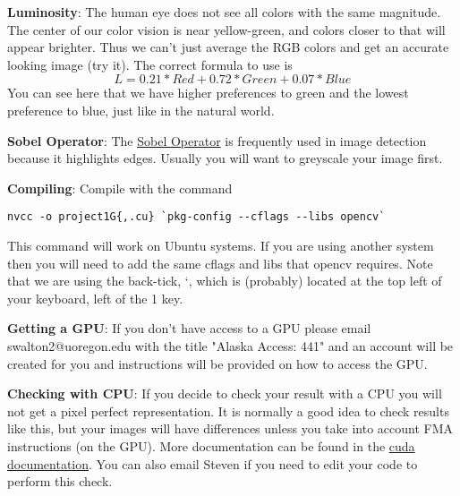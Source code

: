 \documentclass[12pt,letter]{article}
\begin{document}
\textbf{Luminosity}: The human eye does not see all colors with the same 
magnitude. The center of our color vision is near yellow-green, and colors
closer to that will appear brighter. Thus we can't just average the RGB colors
and get an accurate looking image (try it). The correct formula to use is
\begin{equation}
    L = 0.21 * Red + 0.72 * Green + 0.07 * Blue
\end{equation}
You can see here that we have higher preferences to green and the lowest 
preference to blue, just like in the natural world. 


\textbf{Sobel Operator}: The \href{https://en.wikipedia.org/wiki/Sobel_operator}
{Sobel Operator} is frequently used in image detection because it highlights
edges. Usually you will want to greyscale your image first.


\textbf{Compiling}: Compile with the command
\begin{lstlisting}
nvcc -o project1G{,.cu} `pkg-config --cflags --libs opencv`
\end{lstlisting}
This command will work on Ubuntu systems. If you are using another system then
you will need to add the same cflags and libs that opencv requires. 
Note that we are using the back-tick, `, which is (probably) located at the top
left of your keyboard, left of the 1 key.


\textbf{Getting a GPU}: If you don't have access to a GPU please email
swalton2@uoregon.edu with the title "Alaska Access: 441" and an account will
be created for you and instructions will be provided on how to access the GPU.


\textbf{Checking with CPU}: If you decide to check your result with a CPU you
will not get a pixel perfect representation. It is normally a good idea to check
results like this, but your images will have differences unless you take into
account FMA instructions (on the GPU). More documentation can be found in
the \href{https://docs.nvidia.com/cuda/floating-point/index.html#axzz42SnDmIrm}{cuda documentation}. You can also email Steven if you need to edit your code to 
perform this check. 
\end{document}

